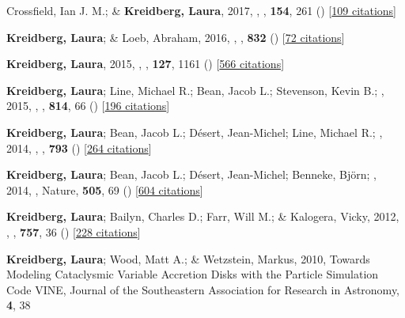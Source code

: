 \item[{\color{numcolor}\scriptsize8}] Crossfield, Ian J. M.; \& \textbf{Kreidberg, Laura}, 2017, , \aj, \textbf{154}, 261 () [\href{https://ui.adsabs.harvard.edu/abs/2017AJ....154..261C}{109 citations}]

\item[{\color{numcolor}\scriptsize7}] \textbf{Kreidberg, Laura}; \& Loeb, Abraham, 2016, , \apj, \textbf{832} () [\href{https://ui.adsabs.harvard.edu/abs/2016ApJ...832L..12K}{72 citations}]

\item[{\color{numcolor}\scriptsize6}] \textbf{Kreidberg, Laura}, 2015, , \pasp, \textbf{127}, 1161 () [\href{https://ui.adsabs.harvard.edu/abs/2015PASP..127.1161K}{566 citations}]

\item[{\color{numcolor}\scriptsize5}] \textbf{Kreidberg, Laura}; Line, Michael R.; Bean, Jacob L.; Stevenson, Kevin B.; \etal, 2015, , \apj, \textbf{814}, 66 () [\href{https://ui.adsabs.harvard.edu/abs/2015ApJ...814...66K}{196 citations}]

\item[{\color{numcolor}\scriptsize4}] \textbf{Kreidberg, Laura}; Bean, Jacob L.; D{\'e}sert, Jean-Michel; Line, Michael R.; \etal, 2014, , \apj, \textbf{793} () [\href{https://ui.adsabs.harvard.edu/abs/2014ApJ...793L..27K}{264 citations}]

\item[{\color{numcolor}\scriptsize3}] \textbf{Kreidberg, Laura}; Bean, Jacob L.; D{\'e}sert, Jean-Michel; Benneke, Bj{\"o}rn; \etal, 2014, , Nature, \textbf{505}, 69 () [\href{https://ui.adsabs.harvard.edu/abs/2014Natur.505...69K}{604 citations}]

\item[{\color{numcolor}\scriptsize2}] \textbf{Kreidberg, Laura}; Bailyn, Charles D.; Farr, Will M.; \& Kalogera, Vicky, 2012, , \apj, \textbf{757}, 36 () [\href{https://ui.adsabs.harvard.edu/abs/2012ApJ...757...36K}{228 citations}]

\item[{\color{numcolor}\scriptsize1}] \textbf{Kreidberg, Laura}; Wood, Matt A.; \& Wetzstein, Markus, 2010, Towards Modeling Cataclysmic Variable Accretion Disks with the Particle Simulation Code VINE, Journal of the Southeastern Association for Research in Astronomy, \textbf{4}, 38